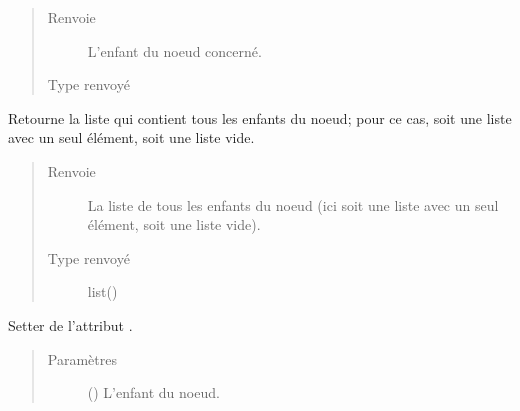 \documentclass[letterpaper,10pt,french]{sphinxmanual}
\begin{document}
\begin{fulllineitems}
\begin{fulllineitems}
\begin{quote}
\begin{description}
\item[{Renvoie}] \leavevmode
{} \textendash{} L’enfant du noeud concerné.

\item[{Type renvoyé}] \leavevmode
{\hyperref[\detokenize{index:StrategyTree.NodeST}]{}}

\end{description}\end{quote}

\end{fulllineitems}


\begin{fulllineitems}
\label{\detokenize{index:StrategyTree.Repair.get_list_of_children}}
Retourne la liste qui contient tous les enfants du noeud; pour ce cas,
soit une liste avec un seul élément, soit une liste vide.
\begin{quote}\begin{description}
\item[{Renvoie}] \leavevmode
{} \textendash{} La liste de tous les enfants du noeud (ici soit une liste avec un
seul élément, soit une liste vide).

\item[{Type renvoyé}] \leavevmode
list({\hyperref[\detokenize{index:StrategyTree.NodeST}]{}})

\end{description}\end{quote}

\end{fulllineitems}


\begin{fulllineitems}
\label{\detokenize{index:StrategyTree.Repair.set_child}}
Setter de l’attribut .
\begin{quote}\begin{description}
\item[{Paramètres}] \leavevmode
{} ({\hyperref[\detokenize{index:StrategyTree.NodeST}]{}}\sphinxstyleliteralemphasis{\sphinxupquote{, }}) \textendash{} L’enfant du noeud.


\end{description}
\end{quote}
\end{fulllineitems}
\end{fulllineitems}
\end{document}
